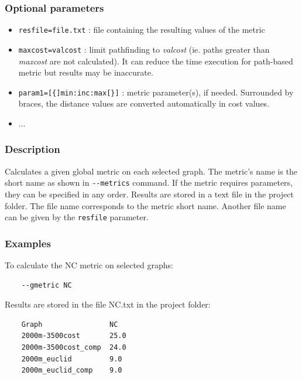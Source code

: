 \documentclass[a4paper,10pt]{report}
\begin{document}
\subsubsection{Optional parameters}
\begin{itemize}
	\item \verb|resfile=file.txt| : file containing the resulting values of the metric
	\item \verb|maxcost=valcost| : limit pathfinding to \textit{valcost} (ie. paths greater than \textit{maxcost} are not calculated). It can reduce the time execution for path-based metric but results may be inaccurate.
	\item \verb|param1=[{]min:inc:max[}]| : metric parameter(s), if needed. Surrounded by braces, the distance values are converted automatically in cost values.
	\item ...
\end{itemize}

\subsubsection{Description}
Calculates a given global metric on each selected graph. 
The metric's name is the short name as shown in \verb|--metrics| command.
If the metric requires parameters, they can be specified in any order.
Results are stored in a text file in the project folder. The file name corresponds to the metric short name.
Another file name can be given by the \verb|resfile| parameter.

\subsubsection{Examples}
To calculate the NC metric on selected graphs:
\begin{Verbatim}
	--gmetric NC
\end{Verbatim}
Results are stored in the file NC.txt in the project folder:
\begin{Verbatim}
	Graph                NC
	2000m-3500cost       25.0
	2000m-3500cost_comp  24.0
	2000m_euclid         9.0
	2000m_euclid_comp    9.0
\end{Verbatim}
\end{document}

